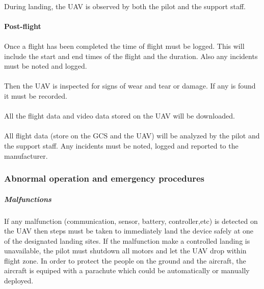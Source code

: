 \documentclass[]{article}
\begin{document}
	\paragraph{} During landing, the UAV is observed by both the pilot and the support staff.
	
	\paragraph{Post-flight}
	\paragraph{} Once a flight has been completed the time of flight must be logged. This will include the start and end times of the flight and the duration. Also any incidents must be noted and logged.
	\paragraph{} Then the UAV is inspected for signs of wear and tear or damage. If any is found it must be recorded.
    \paragraph{} All the flight data and video data stored on the UAV will be downloaded. 
    \paragraph{} All flight data (store on the GCS and the UAV) will be analyzed by the pilot and the support staff. Any incidents must be noted, logged and reported to the manufacturer.
    
    \subsubsection{Abnormal operation and emergency procedures}
	\subparagraph{Malfunctions}
	\paragraph{} If any malfunction (communication, sensor, battery, controller,etc) is detected on the UAV then steps must be taken to immediately land the device safely at one of the designated landing sites. If the malfunction make a controlled landing is unavailable, the pilot must shutdown all motors and let the UAV drop within flight zone. In order to protect the people on the ground and the aircraft, the aircraft is equiped with a parachute which could be automatically or manually deployed.    
\end{document}
